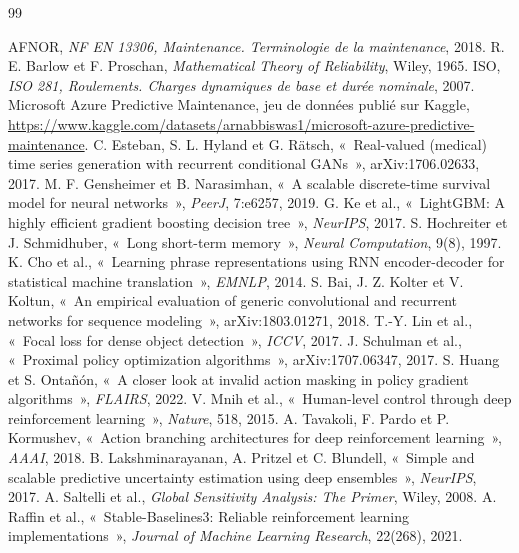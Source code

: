\documentclass[11pt,a4paper]{article}
\begin{document}
\begin{thebibliography}{99}
\small
\NoAutoSpacing
\setlength{\itemsep}{0.15em}
 AFNOR, \emph{NF EN 13306, Maintenance. Terminologie de la maintenance}, 2018.
 R. E. Barlow et F. Proschan, \emph{Mathematical Theory of Reliability}, Wiley, 1965.
 ISO, \emph{ISO 281, Roulements. Charges dynamiques de base et durée nominale}, 2007.
 Microsoft Azure Predictive Maintenance, jeu de données publié sur Kaggle, \url{https://www.kaggle.com/datasets/arnabbiswas1/microsoft-azure-predictive-maintenance}.
 C. Esteban, S. L. Hyland et G. Rätsch, «~Real-valued (medical) time series generation with recurrent conditional GANs~», arXiv:1706.02633, 2017.
 M. F. Gensheimer et B. Narasimhan, «~A scalable discrete-time survival model for neural networks~», \emph{PeerJ}, 7:e6257, 2019.
 G. Ke et al., «~LightGBM: A highly efficient gradient boosting decision tree~», \emph{NeurIPS}, 2017.
 S. Hochreiter et J. Schmidhuber, «~Long short-term memory~», \emph{Neural Computation}, 9(8), 1997.
 K. Cho et al., «~Learning phrase representations using RNN encoder-decoder for statistical machine translation~», \emph{EMNLP}, 2014.
 S. Bai, J. Z. Kolter et V. Koltun, «~An empirical evaluation of generic convolutional and recurrent networks for sequence modeling~», arXiv:1803.01271, 2018.
 T.-Y. Lin et al., «~Focal loss for dense object detection~», \emph{ICCV}, 2017.
 J. Schulman et al., «~Proximal policy optimization algorithms~», arXiv:1707.06347, 2017.
 S. Huang et S. Ontañón, «~A closer look at invalid action masking in policy gradient algorithms~», \emph{FLAIRS}, 2022.
 V. Mnih et al., «~Human-level control through deep reinforcement learning~», \emph{Nature}, 518, 2015.
 A. Tavakoli, F. Pardo et P. Kormushev, «~Action branching architectures for deep reinforcement learning~», \emph{AAAI}, 2018.
 B. Lakshminarayanan, A. Pritzel et C. Blundell, «~Simple and scalable predictive uncertainty estimation using deep ensembles~», \emph{NeurIPS}, 2017.
 A. Saltelli et al., \emph{Global Sensitivity Analysis: The Primer}, Wiley, 2008.
 A. Raffin et al., «~Stable-Baselines3: Reliable reinforcement learning implementations~», \emph{Journal of Machine Learning Research}, 22(268), 2021.
\end{thebibliography}
\end{document}
